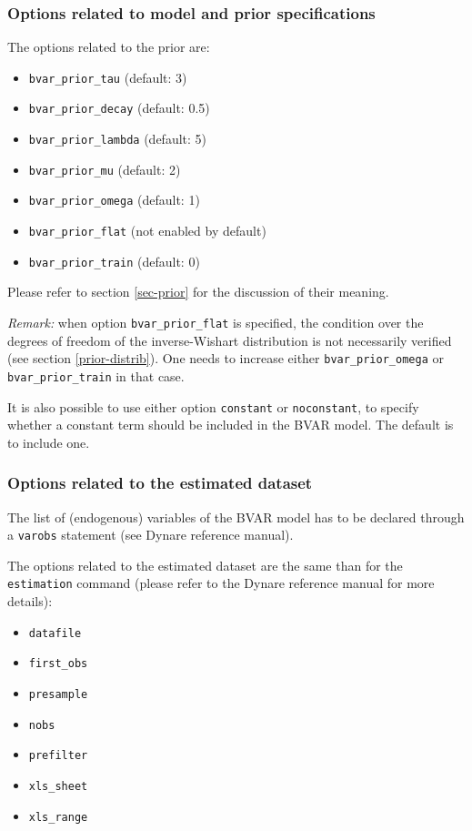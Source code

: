 \documentclass[11pt,a4paper]{article}
\begin{document}
\subsubsection{Options related to model and prior specifications}
\label{sec-model-prior-options}

The options related to the prior are:
\begin{itemize}
\item \texttt{bvar\_prior\_tau} (default: 3)
\item \texttt{bvar\_prior\_decay} (default: 0.5)
\item \texttt{bvar\_prior\_lambda} (default: 5)
\item \texttt{bvar\_prior\_mu} (default: 2)
\item \texttt{bvar\_prior\_omega} (default: 1)
\item \texttt{bvar\_prior\_flat} (not enabled by default)
\item \texttt{bvar\_prior\_train} (default: 0)
\end{itemize}
Please refer to section \ref{sec-prior} for the discussion of their meaning.

\emph{Remark:} when option \texttt{bvar\_prior\_flat} is specified, the condition over the degrees of freedom of the inverse-Wishart distribution is not necessarily verified (see section \ref{prior-distrib}). One needs to increase either \texttt{bvar\_prior\_omega} or \texttt{bvar\_prior\_train} in that case.

It is also possible to use either option \texttt{constant} or \texttt{noconstant}, to specify whether a constant term should be included in the BVAR model. The default is to include one.

\subsubsection{Options related to the estimated dataset}

The list of (endogenous) variables of the BVAR model has to be declared through a \texttt{varobs} statement (see Dynare reference manual).

The options related to the estimated dataset are the same than for the \texttt{estimation} command (please refer to the Dynare reference manual for more details):
\begin{itemize}
\item \texttt{datafile}
\item \texttt{first\_obs}
\item \texttt{presample}
\item \texttt{nobs}
\item \texttt{prefilter}
\item \texttt{xls\_sheet}
\item \texttt{xls\_range}
\end{itemize}
\end{document}
